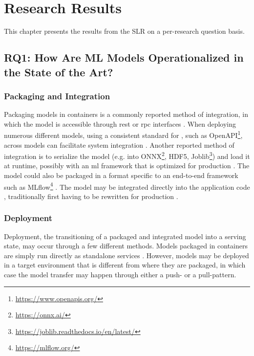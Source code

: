 \chapter{Research Results}
\label{ch:research_results}
This chapter presents the results from the SLR on a per-research question basis.

\section{RQ1: How Are ML Models Operationalized in the State of the Art?}
\label{ch:research_results:rq1_how}
\subsection{Packaging and Integration}
Packaging models in containers is a commonly reported method of integration, in which the model is accessible through \acrfull{rest} or \acrfull{rpc} interfaces \cite{Garcia2020, Li2017, Ruf2021, Crankshaw2017}.
When deploying numerous different models, using a consistent standard for , such as OpenAPI\footnote{\url{https://www.openapis.org/}}, across models can facilitate system integration \cite{Garcia2020}.
Another reported method of integration is to serialize the model (e.g. into ONNX\footnote{\url{https://onnx.ai/}}, HDF5, Joblib\footnote{\url{https://joblib.readthedocs.io/en/latest/}}) and load it at runtime, possibly with an \acrshort{ml} framework that is optimized for production \cite{Hazelwood2018, Peticolas2019, Paeaekkoenen2020, Chahal2020}.
The model could also be packaged in a format specific to an end-to-end framework such as MLflow\footnote{\url{https://mlflow.org/}} \cite{Chen2020}.
The model may be integrated directly into the application code \cite{Liu2020, Ruf2021, Granlund2021}, traditionally first having to be rewritten for production \cite{Hazelwood2018}.

\subsection{Deployment}
Deployment, the transitioning of a  packaged and integrated model into a serving state, may occur through a few different methods.
Models packaged in containers are simply run directly as standalone services \cite{Liu2020,Ruf2021, Granlund2021, Li2017, Garcia2020}.
However, models may be deployed in a target environment that is different from where they are packaged, in which case the model transfer may happen through either a push- or a pull-pattern.

